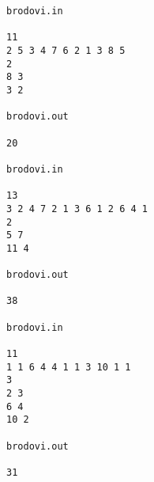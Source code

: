 \begin{verbatim}
brodovi.in 
 
11 
2 5 3 4 7 6 2 1 3 8 5 
2 
8 3 
3 2 
 
brodovi.out 
 
20 

brodovi.in 
 
13 
3 2 4 7 2 1 3 6 1 2 6 4 1 
2 
5 7 
11 4 
 
brodovi.out 
 
38

brodovi.in 
 
11 
1 1 6 4 4 1 1 3 10 1 1 
3 
2 3 
6 4 
10 2 
 
brodovi.out 
 
31 
\end{verbatim}

 